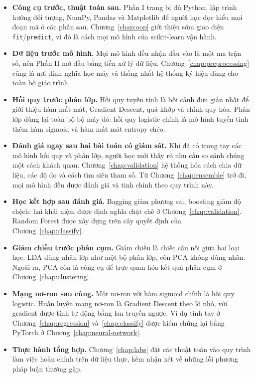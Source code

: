 \begin{itemize}
    \item \textbf{Công cụ trước, thuật toán sau.} Phần I trang bị đủ Python, lập trình hướng đối tượng, NumPy, Pandas và Matplotlib để người học đọc hiểu mọi đoạn mã ở các phần sau. Chương~\ref{chap:oop} giới thiệu sớm giao diện \texttt{fit}/\texttt{predict}, vì đó là cách mọi mô hình của scikit-learn vận hành.
    \item \textbf{Dữ liệu trước mô hình.} Mọi mô hình đều nhận đầu vào là một ma trận số, nên Phần II mở đầu bằng tiền xử lý dữ liệu. Chương~\ref{chap:preprocessing} cũng là nơi định nghĩa học máy và thống nhất hệ thống ký hiệu dùng cho toàn bộ giáo trình.
    \item \textbf{Hồi quy trước phân lớp.} Hồi quy tuyến tính là bối cảnh đơn giản nhất để giới thiệu hàm mất mát, Gradient Descent, quá khớp và chính quy hóa. Phân lớp dùng lại toàn bộ bộ máy đó: hồi quy logistic chính là mô hình tuyến tính thêm hàm sigmoid và hàm mất mát entropy chéo.
    \item \textbf{Đánh giá ngay sau hai bài toán có giám sát.} Khi đã có trong tay các mô hình hồi quy và phân lớp, người học mới thấy rõ nhu cầu so sánh chúng một cách khách quan. Chương~\ref{chap:validation} hệ thống hóa cách chia dữ liệu, các độ đo và cách tìm siêu tham số. Từ Chương~\ref{chap:ensemble} trở đi, mọi mô hình đều được đánh giá và tinh chỉnh theo quy trình này.
    \item \textbf{Học kết hợp sau đánh giá.} Bagging giảm phương sai, boosting giảm độ chệch: hai khái niệm được định nghĩa chặt chẽ ở Chương~\ref{chap:validation}. Random Forest được xây dựng trên cây quyết định của Chương~\ref{chap:classify}.
    \item \textbf{Giảm chiều trước phân cụm.} Giảm chiều là chiếc cầu nối giữa hai loại học. LDA dùng nhãn lớp như một bộ phân lớp, còn PCA không dùng nhãn. Ngoài ra, PCA còn là công cụ để trực quan hóa kết quả phân cụm ở Chương~\ref{chap:clustering}.
    \item \textbf{Mạng nơ-ron sau cùng.} Một nơ-ron với hàm sigmoid chính là hồi quy logistic. Huấn luyện mạng nơ-ron là Gradient Descent theo lô nhỏ, với gradient được tính tự động bằng lan truyền ngược. Ví dụ tính tay ở Chương~\ref{chap:regression} và~\ref{chap:classify} được kiểm chứng lại bằng PyTorch ở Chương~\ref{chap:neural-network}.
    \item \textbf{Thực hành tổng hợp.} Chương~\ref{chap:labs} đặt các thuật toán vào quy trình làm việc hoàn chỉnh trên dữ liệu thực, kèm nhận xét về những lỗi phương pháp luận thường gặp.
\end{itemize}

